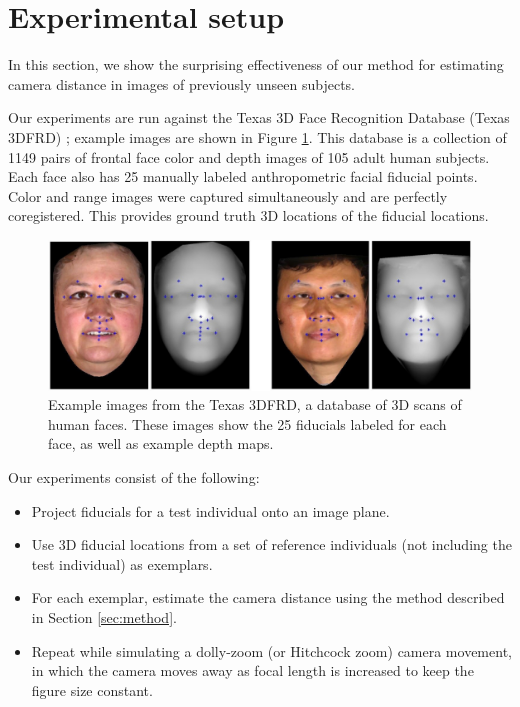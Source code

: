 \documentclass[runningheads]{llncs}
\begin{document}
\section{Experimental setup} \label{sec:experiments}
In this section, we show the surprising effectiveness of our method for estimating camera distance in images of previously unseen subjects.

Our experiments are run against the Texas 3D Face Recognition Database (Texas 3DFRD) \cite{gupta2010texas}; example images are shown in Figure \ref{fig:t3dfrd}.  
This database is a collection of 1149 pairs of frontal face color and depth images of 105 adult human subjects.  
Each face also has 25 manually labeled anthropometric facial fiducial points.  
Color and range images were captured simultaneously and are perfectly coregistered.  
This provides ground truth 3D locations of the fiducial locations.  

\begin{figure}[h]
\centering
\includegraphics[width=1\linewidth]{resources/figures/t3dfr.jpg}
\caption{
Example images from the Texas 3DFRD, a database of 3D scans of human faces.
These images show the 25 fiducials labeled for each face, as well as example depth maps.
}
\label{fig:t3dfrd}
\end{figure}

Our experiments consist of the following:
\begin{itemize}
\item Project fiducials for a test individual onto an image plane.
\item Use 3D fiducial locations from a set of reference individuals (not including the test individual) as exemplars.
\item For each exemplar, estimate the camera distance using the method described in Section \ref{sec:method}.
\item Repeat while simulating a dolly-zoom (or Hitchcock zoom) camera movement, in which the camera moves away as focal length is increased to keep the figure size constant.
\end{itemize}
\end{document}
